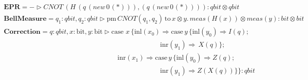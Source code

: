 \documentclass[10pt,a4paper]{amsart}
\theoremstyle{definition}
\theoremstyle{definition}
\theoremstyle{definition}
\theoremstyle{definition}
\theoremstyle{definition}
\theoremstyle{definition}
\begin{document}
\begin{align*}
   &\textbf{EPR} =  - \triangleright  \textit{CNOT} \hspace{2pt} (\textit{H}\hspace{2pt} (q  \hspace{2pt}    ( \textit{new}   \hspace{2pt}  0 \hspace{1pt}(*))),(q  \hspace{2pt}   ( \textit{new}   \hspace{2pt}  0 \hspace{1pt}(*)))) : \textit{qbit} \otimes \textit{qbit}  \\ 
      &\textbf{BellMeasure} =  q_{1}: \textit{qbit}, q_{2}: \textit{qbit}  \triangleright  \text{pm}  \hspace{2pt} \textit{CNOT} (q_{1},q_{2})  \hspace{2pt}  \text{to} \hspace{2pt} x \otimes y.  \hspace{2pt}  \textit{meas} (\textit{H} (x)) \otimes \textit{meas} (y) :  \textit{bit} \otimes \textit{bit} \\
      &\textbf{Correction}= q: \textit{qbit}, x: \text{bit},  y: \text{bit} \triangleright  \text{case } x  \hspace{2pt}  \{\text{inl} (x_{0}) \Rightarrow  \text{case}\hspace{2pt} y  \hspace{2pt}  \{\text{inl} (y_{0})  \Rightarrow{}  \textit{I}(q); \\
      & \hspace{275pt} \text{inr} (y_{1}) \Rightarrow  \hspace{2pt}   \textit{X} (q)\} ; \\
      & \hspace{200pt}\text{inr} (x_{1})  \Rightarrow  \text{case}\hspace{2pt} y  \hspace{2pt}  \{\text{inl} (y_{0})  \Rightarrow   \textit{Z}(q);  \\
      &\hspace{275pt} \text{inr} (y_{1}) \Rightarrow{} \textit{Z} (\textit{X}(q)) \}\} : \textit{qbit}
 \end{align*}
\end{document}
